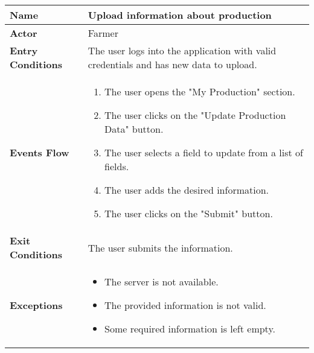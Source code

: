 \begin{center}
\renewcommand{\arraystretch}{1.25}
\begin{tabular}{|l|>{\raggedright\arraybackslash}m{12cm}|}

    \hline
    \textbf{Name} & Upload information about production\\
    \hline
   	\textbf{Actor} & Farmer\\
    \hline
    \textbf{Entry Conditions} & The user logs into the application with valid credentials and has new data to upload.\\
    \hline
    
    \textbf{Events Flow} & 
    		\begin{enumerate}
    			\item The user opens the "My Production" section.
    			\item The user clicks on the "Update Production Data" button.
    			\item The user selects a field to update from a list of fields.
    			\item The user adds the desired information.
    			\item The user clicks on the "Submit" button.
    		\end{enumerate}
    	\\
    \hline
    \textbf{Exit Conditions} & The user submits the information.\\
    \hline
    \textbf{Exceptions} & 
    		\begin{itemize}
    			\item The server is not available.
    			\item The provided information is not valid.
    			\item Some required information is left empty.
    		\end{itemize}
    \\
    \hline
\end{tabular}
\end{center}